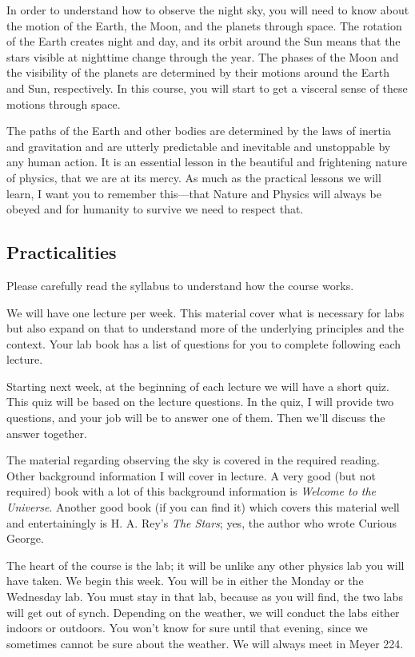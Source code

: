 \documentclass[12pt, preprint]{aastex}
\begin{document}
In order to understand how to observe the night sky, you will need to
know about the motion of the Earth, the Moon, and the planets through
space. The rotation of the Earth creates night and day, and its orbit
around the Sun means that the stars visible at nighttime change
through the year. The phases of the Moon and the visibility of the
planets are determined by their motions around the Earth and Sun,
respectively. In this course, you will start to get a visceral sense
of these motions through space.

The paths of the Earth and other bodies are determined by the laws of
inertia and gravitation and are utterly predictable and inevitable and
unstoppable by any human action. It is an essential lesson in the
beautiful and frightening nature of physics, that we are at its
mercy. As much as the practical lessons we will learn, I want you to
remember this---that Nature and Physics will always be obeyed and for
humanity to survive we need to respect that.

\subsection{Practicalities}

Please carefully read the syllabus to understand how the course works.

We will have one lecture per week. This material cover what is
necessary for labs but also expand on that to understand more of the
underlying principles and the context. Your lab book has a list of
questions for you to complete following each lecture.

Starting next week, at the beginning of each lecture we will have a
short quiz. This quiz will be based on the lecture questions. In the
quiz, I will provide two questions, and your job will be to answer one
of them. Then we'll discuss the answer together.

The material regarding observing the sky is covered in the required
reading. Other background information I will cover in lecture. A very
good (but not required) book with a lot of this background information
is {\it Welcome to the Universe}.  Another good book (if you can find
it) which covers this material well and entertainingly is H. A. Rey's
{\it The Stars}; yes, the author who wrote Curious George.

The heart of the course is the lab; it will be unlike any other
physics lab you will have taken. We begin this week. You will be in
either the Monday or the Wednesday lab. You must stay in that lab,
because as you will find, the two labs will get out of synch.
Depending on the weather, we will conduct the labs either indoors or
outdoors. You won't know for sure until that evening, since we
sometimes cannot be sure about the weather. We will always meet in
Meyer 224.
\end{document}
